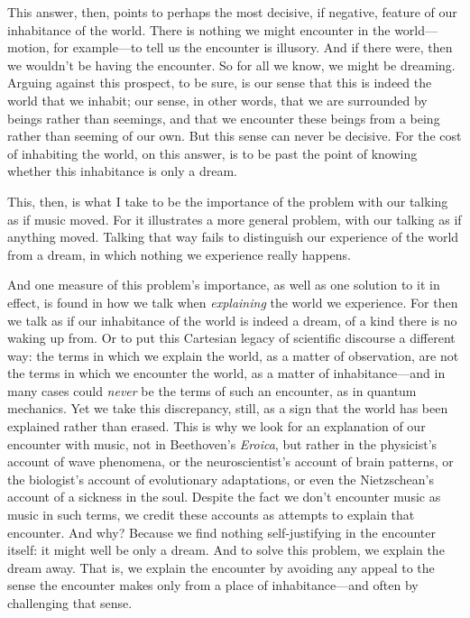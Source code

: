 \documentclass[12pt]{memoir}
\begin{document}
This answer, then, points to perhaps the most decisive, if negative,
feature of our inhabitance of the world. There is nothing we might
encounter in the world---motion, for example---to tell us the encounter
is illusory. And if there were, then we wouldn't be having the
encounter. So for all we know, we might be dreaming. Arguing against
this prospect, to be sure, is our sense that this is indeed the world
that we inhabit; our sense, in other words, that we are surrounded by
beings rather than seemings, and that we encounter these beings from a
being rather than seeming of our own. But this sense can never be
decisive. For the cost of inhabiting the world, on this answer, is to be
past the point of knowing whether this inhabitance is only a dream.

This, then, is what I take to be the importance of the problem with our
talking as if music moved. For it illustrates a more general problem,
with our talking as if anything moved. Talking that way fails to
distinguish our experience of the world from a dream, in which nothing
we experience really happens.

And one measure of this problem's importance, as well as one solution to
it in effect, is found in how we talk when \emph{explaining} the world
we experience. For then we talk as if our inhabitance of the world is
indeed a dream, of a kind there is no waking up from. Or to put this
Cartesian legacy of scientific discourse a different way: the terms in
which we explain the world, as a matter of observation, are not the
terms in which we encounter the world, as a matter of inhabitance---and
in many cases could \emph{never} be the terms of such an encounter, 
as in quantum mechanics. Yet we take this discrepancy, still, as a sign that the
world has been explained rather than erased. This is why we look
for an explanation of our encounter with music, not in Beethoven's
\emph{Eroica}, but rather in the physicist's account of wave phenomena,
or the neuroscientist's account of brain patterns, or the biologist's
account of evolutionary adaptations, or even the Nietzschean's account
of a sickness in the soul. Despite the fact we don't encounter
music as music in such terms, we credit these accounts as attempts to
explain that encounter. And why? Because we find nothing self-justifying
in the encounter itself: it might well be only a dream. And to solve
this problem, we explain the dream away. That is, we explain the
encounter by avoiding any appeal to the sense the encounter makes only
from a place of inhabitance---and often by challenging that sense.
\end{document}
